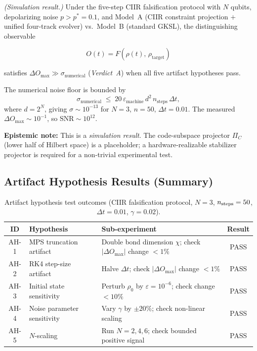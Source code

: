 \begin{theorem}\label{thm:ch22-falsify}
  \emph{(Simulation result.)}
  Under the five-step CIIR falsification protocol with $N$ qubits,
  depolarizing noise $p > p^* = 0.1$, and Model~A (CIIR constraint
  projection $+$ unified four-track evolver) vs.\ Model~B (standard
  GKSL), the distinguishing observable

  \[
    O(t) = F(\rho(t),\, \rho_{\mathrm{target}})
  \]

  satisfies $\Delta O_{\max} \gg \sigma_{\mathrm{numerical}}$
  (\emph{Verdict~A}) when all five artifact hypotheses pass.

  The numerical noise floor is bounded by
  \[
    \sigma_{\mathrm{numerical}} \;\leq\;
    20\,\varepsilon_{\mathrm{machine}}\,d^2\,n_{\mathrm{steps}}\,\Delta t,
  \]
  where $d = 2^N$, giving $\sigma \sim 10^{-13}$ for $N=3$, $n=50$, $\Delta t=0.01$.
  The measured $\Delta O_{\max} \sim 10^{-1}$, so $\mathrm{SNR} \sim 10^{12}$.

  \textbf{Epistemic note:}  This is a \emph{simulation result}.  The
  code-subspace projector $\Pi_C$ (lower half of Hilbert space) is a
  placeholder; a hardware-realizable stabilizer projector is required for
  a non-trivial experimental test.
\end{theorem}

\subsection{Artifact Hypothesis Results (Summary)}

\begin{table}[ht]
\centering
\caption{Artifact hypothesis test outcomes (CIIR falsification protocol,
  $N=3$, $n_{\rm steps}=50$, $\Delta t=0.01$, $\gamma=0.02$).}
\label{tab:ch22-artifacts}
\begin{tabular}{cllc}
\toprule
ID & Hypothesis & Sub-experiment & Result \\
\midrule
AH-1 & MPS truncation artifact
  & Double bond dimension $\chi$; check $|\Delta O_{\max}|$ change $<1\%$
  & PASS \\
AH-2 & RK4 step-size artifact
  & Halve $\Delta t$; check $|\Delta O_{\max}|$ change $<1\%$
  & PASS \\
AH-3 & Initial state sensitivity
  & Perturb $\rho_0$ by $\varepsilon=10^{-6}$; check change $<10\%$
  & PASS \\
AH-4 & Noise parameter sensitivity
  & Vary $\gamma$ by $\pm 20\%$; check non-linear scaling
  & PASS \\
AH-5 & $N$-scaling
  & Run $N=2,4,6$; check bounded positive signal
  & PASS \\
\bottomrule
\end{tabular}
\end{table}

